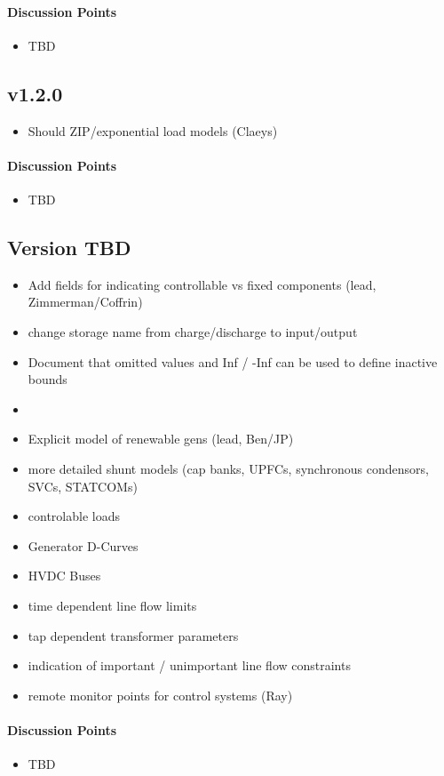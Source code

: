 \documentclass{article}
\begin{document}
\paragraph{Discussion Points}
\begin{itemize}
    \item TBD
\end{itemize}


\subsection{v1.2.0}

\begin{itemize}
     \item Should ZIP/exponential load models (Claeys)
\end{itemize}

\paragraph{Discussion Points}
\begin{itemize}
    \item TBD
\end{itemize}


\subsection{Version TBD}

\begin{itemize}
    \item Add fields for indicating controllable vs fixed components (lead, Zimmerman/Coffrin)
    \item change storage name from charge/discharge to input/output
    \item Document that omitted values and Inf / -Inf can be used to define inactive bounds
    \item 
    \item Explicit model of renewable gens (lead, Ben/JP)
    \item more detailed shunt models (cap banks, UPFCs, synchronous condensors, SVCs, STATCOMs)
    \item controlable loads 
    \item Generator D-Curves
    \item HVDC Buses
    \item time dependent line flow limits
    \item tap dependent transformer parameters
    \item indication of important / unimportant line flow constraints
    \item remote monitor points for control systems (Ray)
\end{itemize}

\paragraph{Discussion Points}
\begin{itemize}
    \item TBD
\end{itemize}





 
\end{document}
